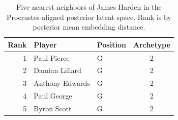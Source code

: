 \begin{table}[htbp]
  \centering\small
  \begin{tabular}{rllc}
    \toprule
    Rank & Player & Position & Archetype \\
    \midrule
    1 & Paul Pierce & G & 2 \\
    2 & Damian Lillard & G & 2 \\
    3 & Anthony Edwards & G & 2 \\
    4 & Paul George & G & 2 \\
    5 & Byron Scott & G & 2 \\
    \bottomrule
  \end{tabular}
  \caption{Five nearest neighbors of James Harden in the Procrustes-aligned posterior latent space. Rank is by posterior mean embedding distance.}
  \label{tab:James_Harden_neighbors}
\end{table}

